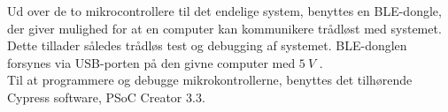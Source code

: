 Ud over de to mikrocontrollere til det endelige system, benyttes en BLE-dongle, der giver mulighed for at en computer kan kommunikere trådløst med systemet. Dette tillader således trådløs test og debugging af systemet. BLE-donglen forsynes via USB-porten på den givne computer med $5~V$ \citep{cypressguide2014}. 
\\

Til at programmere og debugge mikrokontrollerne, benyttes det tilhørende Cypress software, PSoC Creator 3.3. 






